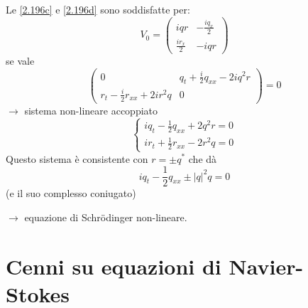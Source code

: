 \documentclass[a4paper,11pt]{report}
\begin{document}
Le \eqref{2.196c} e \eqref{2.196d} sono soddisfatte per:
\[
V_0=\left(\begin{matrix}
iqr & - \frac{iq_x}{2} \\
\frac{ir_x}{2} & - iqr
\end{matrix}\right)
\]
se vale 
\[
\left(\begin{matrix}
0 & q_t + \frac{i}{2}q_{xx} - 2iq^2 r \\
r_t - \frac{i}{2}r_{xx} + 2ir^2 q & 0
\end{matrix}\right)=0
\]
$\rightarrow$ sistema non-lineare accoppiato
\[
\begin{cases}
iq_t - \frac{1}{2}q_{xx} + 2 q^2 r=0\\
ir_t + \frac{1}{2} r_{xx} -2 r^2 q =0 
\end{cases}
\]
Questo sistema \`e consistente con $r=\pm q^*$ che d\`a
\[
iq_t - \frac{1}{2}q_{xx}\pm |q|^2 q=0
\]
(e il suo complesso coniugato)

$\rightarrow$ equazione di Schr\"odinger non-lineare.

\section{Cenni su equazioni di Navier-Stokes}
\end{document}
